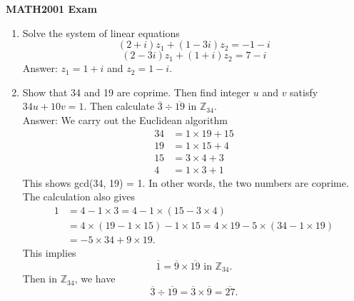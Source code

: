 \documentclass[11pt]{article}
\begin{document}
\begin{center}
\vspace{0.6cm}
{\Large \bf MATH2001 Exam}
\vspace{0.3cm}
\end{center}
\begin{enumerate}
\item Solve the system of linear equations
$$(2+i)z_1+(1-3i)z_2 = -1 - i$$
$$(2-3i)z_1+(1+i)z_2 = 7 - i$$
    Answer: $z_1 = 1+i$ and $z_2 = 1-i$.


\item Show that 34 and 19 are coprime. Then find integer $u$ and $v$ satisfy $34u+10v=1$. Then calculate $\overline{3} \div \overline{19}$ in $\mathbb{Z}_{34}$.\\
    Answer: We carry out the Euclidean algorithm
    \begin{align}
        34 &= 1\times 19 + 15\\
        19 &= 1\times 15 + 4\\
        15 &= 3\times 4 + 3\\
        4 &= 1\times 3 + 1
    \end{align}
    This shows gcd(34, 19) = 1. In other words, the two numbers are coprime.\\
    The calculation also gives
    \begin{align}
        1 &= 4-1\times 3 = 4-1\times(15 - 3\times 4) \\
        &= 4\times(19 - 1\times 15) - 1\times 15 = 4\times 19 -5\times (34 - 1\times 19) \\
        &= -5\times 34 +9\times 19.
    \end{align}
    This implies $$\overline{1} = \overline{9}\times\overline{19}\text{ in }\mathbb{Z}_{34}.$$
    Then in $\mathbb{Z}_{34}$, we have $$\overline{3} \div \overline{19} = \overline{3} \times \overline{9} = \overline{27}.$$



\end{enumerate}
\end{document}
